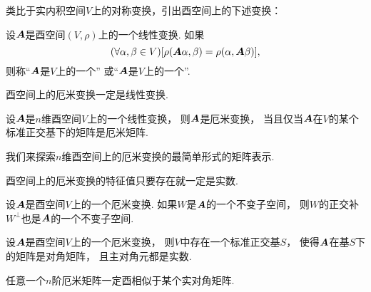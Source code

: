 类比于实内积空间\(V\)上的对称变换，引出酉空间上的下述变换：
\begin{definition}
设\(\boldsymbol{A}\)是酉空间\((V,\rho)\)上的一个线性变换.
如果\begin{equation*}
	(\forall \alpha,\beta \in V)
	[
		\rho(\boldsymbol{A}\alpha,\beta)
		= \rho(\alpha,\boldsymbol{A}\beta)
	],
\end{equation*}
则称“\(\boldsymbol{A}\)是\(V\)上的一个”
或“\(\boldsymbol{A}\)是\(V\)上的一个”.
\end{definition}

\begin{proposition}
酉空间上的厄米变换一定是线性变换.
\end{proposition}

\begin{proposition}
设\(\boldsymbol{A}\)是\(n\)维酉空间\(V\)上的一个线性变换，
则\(\boldsymbol{A}\)是厄米变换，
当且仅当\(\boldsymbol{A}\)在\(V\)的某个标准正交基下的矩阵是厄米矩阵.
\end{proposition}

我们来探索\(n\)维酉空间上的厄米变换的最简单形式的矩阵表示.
\begin{proposition}
酉空间上的厄米变换的特征值只要存在就一定是实数.
\end{proposition}

\begin{proposition}
设\(\boldsymbol{A}\)是酉空间\(V\)上的一个厄米变换.
如果\(W\)是\(\boldsymbol{A}\)的一个不变子空间，
则\(W\)的正交补\(W^\perp\)也是\(\boldsymbol{A}\)的一个不变子空间.
\end{proposition}

\begin{theorem}
设\(\boldsymbol{A}\)是酉空间\(V\)上的一个厄米变换，
则\(V\)中存在一个标准正交基\(S\)，
使得\(\boldsymbol{A}\)在基\(S\)下的矩阵是对角矩阵，
且主对角元都是实数.
\end{theorem}

\begin{corollary}
任意一个\(n\)阶厄米矩阵一定酉相似于某个实对角矩阵.
\end{corollary}
